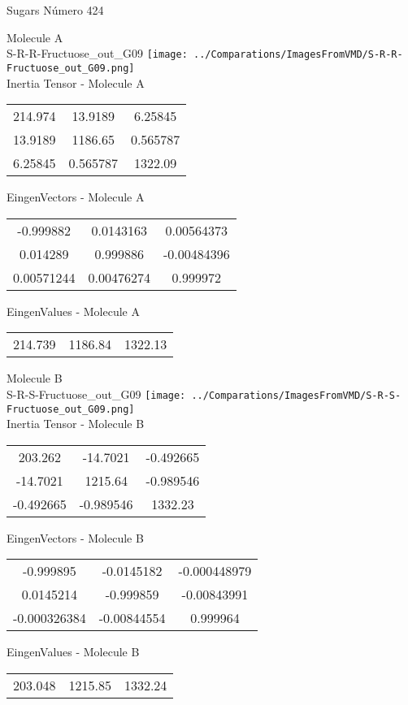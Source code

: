 \vtab[-2cm]
\begin{center}
{\large Sugars \tab Número 424}
\end{center}
\begin{multicols}{2}
\begin{center}

Molecule A \\ 
S-R-R-Fructuose\_out\_G09
\texttt{[image: ../Comparations/ImagesFromVMD/S-R-R-Fructuose\_out\_G09.png]}
\\
Inertia Tensor - Molecule A \\
\vtab

\begin{tabular}{|c c c|}
214.974	 & 	13.9189	 & 	6.25845	 \\
13.9189	 & 	1186.65	 & 	0.565787	 \\
6.25845	 & 	0.565787	 & 	1322.09
\end{tabular}

\vtab
 EingenVectors - Molecule A     \\
\vtab
\begin{tabular}{|c c c|}
-0.999882	 & 	0.0143163	 & 	0.00564373	 \\
0.014289	 & 	0.999886	 & 	-0.00484396	 \\
0.00571244	 & 	0.00476274	 & 	0.999972
\end{tabular}

\vtab
 EingenValues - Molecule A     \\
\vtab
\begin{tabular}{|c c c|}
214.739	 & 	1186.84	 & 	1322.13	 \\
\end{tabular}
\columnbreak

Molecule B \\ 
S-R-S-Fructuose\_out\_G09
\texttt{[image: ../Comparations/ImagesFromVMD/S-R-S-Fructuose\_out\_G09.png]}
\\
Inertia Tensor - Molecule B \\
\vtab

\begin{tabular}{|c c c|}
203.262	 & 	-14.7021	 & 	-0.492665	 \\
-14.7021	 & 	1215.64	 & 	-0.989546	 \\
-0.492665	 & 	-0.989546	 & 	1332.23
\end{tabular}

\vtab
 EingenVectors - Molecule B     \\
\vtab
\begin{tabular}{|c c c|}
-0.999895	 & 	-0.0145182	 & 	-0.000448979	 \\
0.0145214	 & 	-0.999859	 & 	-0.00843991	 \\
-0.000326384	 & 	-0.00844554	 & 	0.999964
\end{tabular}

\vtab
 EingenValues - Molecule B     \\
\vtab
\begin{tabular}{|c c c|}
203.048	 & 	1215.85	 & 	1332.24	 \\
\end{tabular}

\end{center}
\end{multicols}
